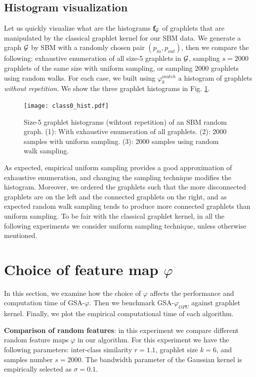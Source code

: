 \subsection{Histogram visualization}
Let us quickly visualize what are the histograms $\mathbf{f}_{\mathcal{G}}$ of graphlets that are manipulated by the classical graphlet kernel for our SBM data. We generate a graph $\mathcal{G}$ by SBM with a randomly chosen pair $(p_{in},p_{out})$, then we compare the following: exhaustive enumeration of all size-5 graphlets in $\mathcal{G}$, sampling $s=2000$ graphlets of the same size with uniform sampling, or sampling 2000 graphlets using random walks. For each case, we built using $\varphi^{match}_k$ a histogram of graphlets \emph{without repetition}. We show the three graphlet histograms in Fig. \ref{fig:graphlet_hist}. 

\begin{figure}[H]
\centering
\texttt{[image: class0\_hist.pdf]}
\caption[Graphlet histograms of uniform and random walk sampling techniques]{Size-5 graphlet histograms (wihtout repetition) of an SBM random graph. (1): With exhaustive enumeration of all graphlets. (2): 2000 samples with uniform sampling. (3): 2000 samples using random walk sampling. }
\label{fig:graphlet_hist}
\end{figure}

As expected, empirical uniform sampling provides a good approximation of exhaustive enumeration, and changing the sampling technique modifies the histogram. Moreover, we ordered the graphlets such that the more disconnected graphlets are on the left and the connected graphlets on the right, and as expected random walk sampling tends to produce more connected graphlets than uniform sampling. To be fair with the classical graphlet kernel, in all the following experiments we consider uniform sampling technique, unless otherwise mentioned.
\section{Choice of feature map $\varphi$ }
\label{section:choice}
In this section, we examine how the choice of $\varphi$ affects the performance and computation time of GSA-$\varphi$. Then we benchmark GSA-$\varphi_{OPU}$ against graphlet kernel. Finally, we plot the empirical computational time of each algorithm. 

\textbf{Comparison of random features}: in this experiment we compare different random feature maps $\varphi$ in our algorithm. For this experiment we have the following parameters:  inter-class similarity $r=1.1$, graphlet size $k=6$, and samples number $s=2000$. The bandwidth parameter of the Gaussian kernel is empirically selected as $\sigma=0.1$.

